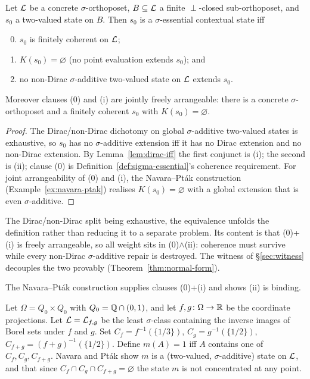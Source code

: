 \begin{theorem}[Localization]\label{thm:localization}
Let $\mathcal{L}$ be a concrete $\sigma$-orthoposet, $B \subseteq \mathcal{L}$ a finite
$\perp$-closed sub-orthoposet, and $s_0$ a two-valued state on $B$. Then $s_0$ is
a $\sigma$-essential contextual state iff
\begin{enumerate}[label=\textup{(\roman*)}, start=0]
  \setcounter{enumi}{-1}
  \item[\textup{(0)}] $s_0$ is finitely coherent on $\mathcal{L}$;
  \item $K(s_0) = \varnothing$ (no point evaluation extends $s_0$); and
  \item no non-Dirac $\sigma$-additive two-valued state on $\mathcal{L}$ extends $s_0$.
\end{enumerate}
Moreover clauses \textup{(0)} and \textup{(i)} are jointly freely arrangeable:
there is a concrete $\sigma$-orthoposet and a finitely coherent $s_0$ with
$K(s_0) = \varnothing$.
\end{theorem}

\begin{proof}
The Dirac/non-Dirac dichotomy on global $\sigma$-additive two-valued states is
exhaustive, so $s_0$ has no $\sigma$-additive extension iff it has no Dirac
extension and no non-Dirac extension. By Lemma~\ref{lem:dirac-iff} the first
conjunct is (i); the second is (ii); clause (0) is Definition~\ref{def:sigma-essential}'s
coherence requirement. For joint arrangeability of (0) and (i), the Navara--Pt\'ak
construction (Example~\ref{ex:navara-ptak}) realises $K(s_0)=\varnothing$ with a
global extension that is even $\sigma$-additive.
\end{proof}

\begin{remark}[Scope]\label{rem:localization-scope}
The Dirac/non-Dirac split being exhaustive, the equivalence unfolds the
definition rather than reducing it to a separate problem. Its content is that
(0)+(i) is freely arrangeable, so all weight sits in (0)$\wedge$(ii): coherence
must survive while every non-Dirac $\sigma$-additive repair is destroyed. The
witness of \S\ref{sec:witness} decouples the two provably
(Theorem~\ref{thm:normal-form}).
\end{remark}

The Navara--Pt\'ak construction supplies clauses (0)+(i) and shows (ii) is binding.

\begin{example}\label{ex:navara-ptak}
Let $\Omega = Q_0\times Q_0$ with $Q_0 = \mathbb{Q}\cap(0,1)$, and let
$f,g\colon\Omega\to\mathbb{R}$ be the coordinate projections. Let $\mathcal{L} = \mathcal{L}_{f,g}$ be
the least $\sigma$-class containing the inverse images of Borel sets under $f$
and $g$. Set $C_f = f^{-1}(\{1/3\})$, $C_g = g^{-1}(\{1/2\})$,
$C_{f+g} = (f+g)^{-1}(\{1/2\})$. Define $m(A)=1$ iff $A$ contains one of $C_f,
C_g, C_{f+g}$. Navara and Pt\'ak show $m$ is a (two-valued, $\sigma$-additive)
state on $\mathcal{L}$, and that since $C_f\cap C_g\cap C_{f+g}=\varnothing$ the state
$m$ is not concentrated at any point.
\end{example}

